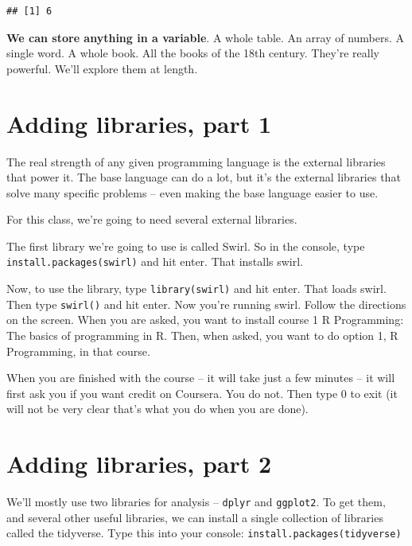 \documentclass[
]{book}
\begin{document}
\begin{verbatim}
## [1] 6
\end{verbatim}

\textbf{We can store anything in a variable}. A whole table. An array of numbers. A single word. A whole book. All the books of the 18th century. They're really powerful. We'll explore them at length.

\hypertarget{adding-libraries-part-1}{%
\section{Adding libraries, part 1}\label{adding-libraries-part-1}}

The real strength of any given programming language is the external libraries that power it. The base language can do a lot, but it's the external libraries that solve many specific problems -- even making the base language easier to use.

For this class, we're going to need several external libraries.

The first library we're going to use is called Swirl. So in the console, type \texttt{install.packages(\textquotesingle{}swirl\textquotesingle{})} and hit enter. That installs swirl.

Now, to use the library, type \texttt{library(swirl)} and hit enter. That loads swirl. Then type \texttt{swirl()} and hit enter. Now you're running swirl. Follow the directions on the screen. When you are asked, you want to install course 1 R Programming: The basics of programming in R. Then, when asked, you want to do option 1, R Programming, in that course.

When you are finished with the course -- it will take just a few minutes -- it will first ask you if you want credit on Coursera. You do not. Then type 0 to exit (it will not be very clear that's what you do when you are done).

\hypertarget{adding-libraries-part-2}{%
\section{Adding libraries, part 2}\label{adding-libraries-part-2}}

We'll mostly use two libraries for analysis -- \texttt{dplyr} and \texttt{ggplot2}. To get them, and several other useful libraries, we can install a single collection of libraries called the tidyverse. Type this into your console: \texttt{install.packages(\textquotesingle{}tidyverse\textquotesingle{})}
\end{document}

